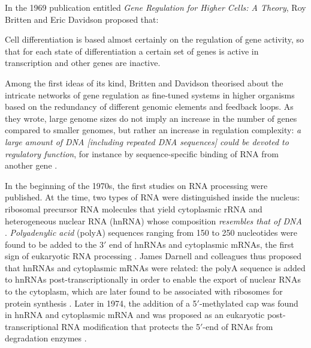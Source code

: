 In the 1969 publication entitled \emph{Gene Regulation for Higher Cells: A Theory}, Roy Britten and Eric Davidson proposed that:

\begin{displayquote}
Cell differentiation is based almost certainly on the regulation of gene activity, so that for each state of differentiation a certain set of genes is active in transcription and other genes are inactive.
\end{displayquote}

Among the first ideas of its kind, Britten and Davidson theorised about the intricate networks of gene regulation as fine-tuned systems in higher organisms based on the redundancy of different genomic elements and feedback loops. As they wrote, large genome sizes do not imply an increase in the number of genes compared to smaller genomes, but rather an increase in regulation complexity: \emph{a large amount of DNA [including repeated DNA sequences] could be devoted to regulatory function}, for instance by sequence-specific binding of RNA from another gene \cite{britten:1969va}. 

In the beginning of the 1970s, the first studies on RNA processing were published. At the time, two types of RNA were distinguished inside the nucleus: ribosomal precursor RNA molecules that yield cytoplasmic rRNA and heterogeneous nuclear RNA (hnRNA) whose composition \emph{resembles that of DNA} \cite{darnell:1971tg}. \emph{Polyadenylic acid} (polyA) sequences ranging from 150 to 250 nucleotides were found to be added to the 3$'$ end of hnRNAs and cytoplasmic mRNAs, the first sign of eukaryotic RNA processing \cite{darnell:1971tg,edmonds:1971vr}. James Darnell and colleagues thus proposed that hnRNAs and cytoplasmic mRNAs were related: the polyA sequence is added to hnRNAs post-transcriptionally in order to enable the export of nuclear RNAs to the cytoplasm, which are later found to be associated with ribosomes for protein synthesis \cite{darnell:1971tg,edmonds:1971vr}. Later in 1974, the addition of a 5$'$-methylated cap was found in hnRNA and cytoplasmic mRNA and was proposed as an eukaryotic post-transcriptional RNA modification that protects the 5$'$-end of RNAs from degradation enzymes \cite{perry:1974uj,rottman:1974tk}.



